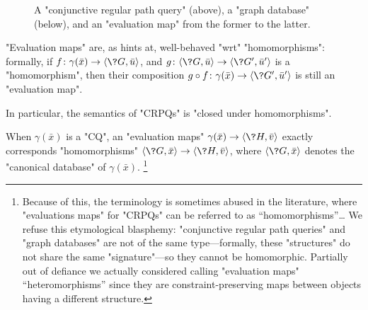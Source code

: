 \begin{figure}
    \centering
    \caption{\AP\label{fig:prelim-db-evaluation-map} A "conjunctive regular path query" (above), 
    a "graph database" (below), and an "evaluation map" from the former
    to the latter.}
\end{figure}
"Evaluation maps" are, as  hints at,
well-behaved "wrt" "homomorphisms": formally, if
$f\colon \gamma(\bar x) \to \tup{\?G, \bar u}$,
and $g\colon \tup{\?G, \bar u} \to \tup{\?G', \bar u'}$ is a "homomorphism",
then their composition $g\circ f\colon \gamma(\bar x) \to \tup{\?G', \bar u'}$ is still
an "evaluation map".%
\begin{fact}
    In particular, the semantics of "CRPQs" is
    "closed under homomorphisms".
\end{fact}
When $\gamma(\bar x)$ is a "CQ", an "evaluation maps" $\gamma(\bar x) \to \tup{\?H, \bar v}$
exactly corresponds "homomorphisms" $\tup{\?G, \bar x} \to \tup{\?H, \bar v}$,
where $\tup{\?G, \bar x}$ denotes the "canonical database" of $\gamma(\bar x)$.%
\footnote{Because of this, the terminology is sometimes abused in the literature, where "evaluations maps" 
for "CRPQs" can be referred to as ``homomorphisms''…
We refuse this etymological blasphemy: "conjunctive 
regular path queries" and "graph databases" are not of the same type---formally, these "structures" do not share the same "signature"---so they cannot be homomorphic.
Partially out of defiance we actually considered calling "evaluation maps" ``heteromorphisms'' since they are constraint-preserving maps between objects having a different structure.}

